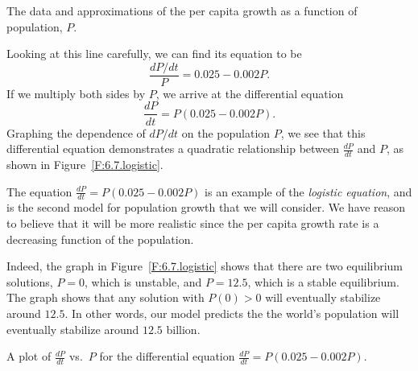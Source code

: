 \begin{marginfigure}[-6cm]
\begin{center}
\end{center}
\caption{The data and approximations of the per capita growth as a function of population, $P$.}
\label{F:6.7.census}
\end{marginfigure}

Looking at this line carefully, we can find its equation to be
$$
\frac{dP/dt}{P} = 0.025 - 0.002P.
$$
If we multiply both sides by $P$, we arrive at the differential
equation
$$
\frac{dP}{dt} = P(0.025 - 0.002P).
$$
Graphing the dependence of $dP/dt$ on the population $P$, we see that this differential equation demonstrates a quadratic relationship between $\frac{dP}{dt}$ and $P$, as shown in Figure~\ref{F:6.7.logistic}.

The equation $\frac{dP}{dt} = P(0.025 - 0.002P)$ is an example of the {\em logistic equation}, 
and is the second model for population growth that we will consider.  We
have reason to believe that it will be more realistic since the per
capita growth rate is a decreasing function of the population.

Indeed, the graph in Figure~\ref{F:6.7.logistic} shows that there are two equilibrium
solutions, $P=0$, which is unstable, and $P=12.5$, which is a stable
equilibrium.  The graph shows that any solution with $P(0) >0$ will
eventually stabilize around $12.5$.  In other words, our model predicts
the the world's population will eventually stabilize around $12.5$
billion.

\begin{marginfigure}
  \caption{A plot of $\frac{dP}{dt}$ vs.~$P$ for the differential equation $\frac{dP}{dt} = P(0.025 - 0.002P)$.}
  \label{F:6.7.logistic}
\end{marginfigure}

